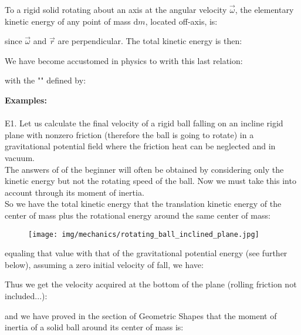 	To a rigid solid rotating about an axis at the angular velocity $\vec{\omega}$, the elementary kinetic energy of any point of mass $\mathrm{d}m$, located off-axis, is:
	
	since $\vec{\omega}$ and $\vec{r}$ are perpendicular. The total kinetic energy is then:
	
	We have become accustomed in physics to writh this last relation:
	
	with the "" defined by:
	
	\begin{tcolorbox}[colframe=black,colback=white,sharp corners]
	\textbf{{\Large {}}Examples:}\\\\
	E1. Let us calculate the final velocity of a rigid ball falling on an incline rigid plane with nonzero friction (therefore the ball is going to rotate) in a gravitational potential field where the friction heat can be neglected and in vacuum.\\

	The answers of of the beginner will often be obtained by considering only the kinetic energy but not the rotating speed of the ball. Now we must take this into account through its moment of inertia.\\

	So we have the total kinetic energy that the translation kinetic energy of the center of mass plus the rotational energy around the same center of mass:
	
	\begin{figure}[H]
		\centering
		\texttt{[image: img/mechanics/rotating\_ball\_inclined\_plane.jpg]}
	\end{figure}
	equaling that value with that of the gravitational potential energy (see further below), assuming a zero initial velocity of fall, we have:
	
	Thus we get the velocity acquired at the bottom of the plane (rolling friction not included...):
	
	and we have proved in the section of Geometric Shapes that the moment of inertia of a solid ball around its center of mass is:
	\end{tcolorbox}
	
